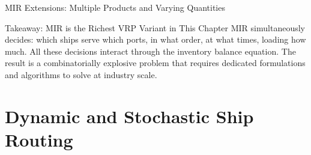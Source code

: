 \documentclass[aspectratio=169,10pt]{beamer}
\begin{document}
\begin{frame}[allowframebreaks]{MIR Extensions: Multiple Products and Varying Quantities}
  \begin{alertblock}{Takeaway: MIR is the Richest VRP Variant in This Chapter}
    MIR simultaneously decides: which ships serve which ports, in what order,
    at what times, loading how much.  All these decisions interact through
    the inventory balance equation.  The result is a combinatorially explosive
    problem that requires dedicated formulations and algorithms to solve at
    industry scale.
  \end{alertblock}
\end{frame}

\section{Dynamic and Stochastic Ship Routing}
\end{document}

